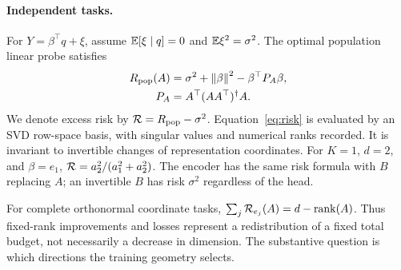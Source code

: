 \paragraph{Independent tasks.}
For $Y=\beta^\top q+\xi$, assume $\mathbb E[\xi\mid q]=0$ and $\mathbb E\xi^2=\sigma^2$. The optimal population linear probe satisfies
\begin{align}
R_{\rm pop}(A)&=\sigma^2+\left\lVert \beta\right\rVert^2-\beta^\top P_A\beta,\label{eq:risk}\\
P_A&=A^\top(AA^\top)^\dagger A.
\end{align}
We denote excess risk by $\mathcal R=R_{\rm pop}-\sigma^2$. Equation~\eqref{eq:risk} is evaluated by an SVD row-space basis, with singular values and numerical ranks recorded. It is invariant to invertible changes of representation coordinates. For $K=1$, $d=2$, and $\beta=e_1$, $\mathcal R=a_2^2/(a_1^2+a_2^2)$. The encoder has the same risk formula with $B$ replacing $A$; an invertible $B$ has risk $\sigma^2$ regardless of the head.

For complete orthonormal coordinate tasks, $\sum_j\mathcal R_{e_j}(A)=d-\operatorname{rank}(A)$. Thus fixed-rank improvements and losses represent a redistribution of a fixed total budget, not necessarily a decrease in dimension. The substantive question is which directions the training geometry selects.
